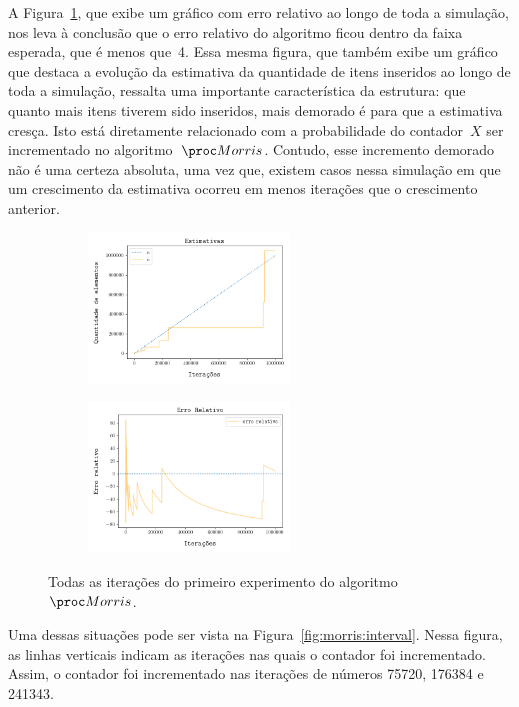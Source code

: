 A Figura~\ref{fig:morris:full}, que exibe um gráfico com erro relativo ao longo de toda a simulação, nos leva
à conclusão que o erro relativo do algoritmo ficou dentro da faixa esperada, que é menos que~4. Essa mesma figura, que 
também exibe um gráfico que destaca a evolução da estimativa da quantidade de itens inseridos ao longo de toda a 
simulação, ressalta uma importante característica da estrutura: que quanto mais itens tiverem sido inseridos, mais 
demorado é para que a estimativa cresça. Isto está diretamente relacionado com a probabilidade do contador~$X$ ser 
incrementado no algoritmo~$\Morris$. Contudo, esse incremento demorado não é uma certeza absoluta, uma vez que, existem 
casos nessa simulação em que um crescimento da estimativa ocorreu em menos iterações que o 
crescimento anterior. 

\begin{figure}
  \centering
  \begin{subfigure}{.5\textwidth}
    \centering
    \captionsetup{justification=centering}
    \includegraphics[width=\linewidth, height=4cm]{figuras/morris_full.png}
  \end{subfigure}%
  \begin{subfigure}{.5\textwidth}
    \centering
    \captionsetup{justification=centering}
    \includegraphics[width=\linewidth, height=4cm]{figuras/morris_erro_full.png}
  \end{subfigure}
  \caption{Todas as iterações do primeiro experimento do algoritmo~$\Morris$.}
  \label{fig:morris:full}
\end{figure}


Uma dessas situações pode ser vista na Figura~\ref{fig:morris:interval}. Nessa figura, as linhas verticais indicam as 
iterações nas quais o contador foi incrementado. Assim, o contador foi incrementado nas iterações de números 75720, 
176384 e 241343. 

